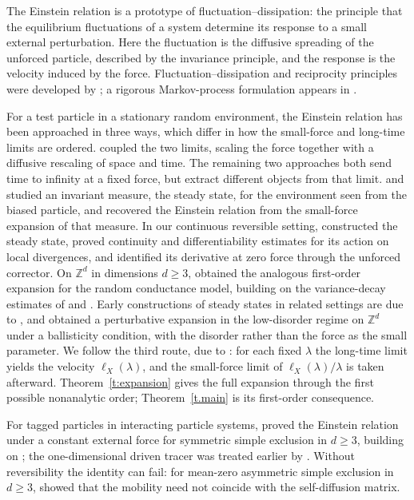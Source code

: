 \documentclass[11pt]{amsart}
\theoremstyle{definition}
\theoremstyle{remark}
\numberwithin{equation}{section}
\newcommand{\Zd}{\mathbb Z^d}
\begin{document}
The Einstein relation is a prototype of fluctuation--dissipation: the principle that the equilibrium fluctuations of a system determine its response to a small external perturbation. Here the fluctuation is the diffusive spreading of the unforced particle, described by the invariance principle, and the response is the velocity induced by the force. Fluctuation--dissipation and reciprocity principles were developed by \citet{Nyquist1928,Onsager1931,Onsager1931II,CallenWelton1951}; a rigorous Markov-process formulation appears in \citet{DemboDeuschel2010}.

For a test particle in a stationary random environment, the Einstein relation has been approached in three ways, which differ in how the small-force and long-time limits are ordered. \citet{LebowitzRost1994} coupled the two limits, scaling the force together with a diffusive rescaling of space and time. The remaining two approaches both send time to infinity at a fixed force, but extract different objects from that limit. \citet{Steady2018mathieu} and \citet*{GantertGuoNagel2017} studied an invariant measure, the steady state, for the environment seen from the biased particle, and recovered the Einstein relation from the small-force expansion of that measure. In our continuous reversible setting, \citet{Steady2018mathieu} constructed the steady state, proved continuity and differentiability estimates for its action on local divergences, and identified its derivative at zero force through the unforced corrector. On $\Zd$ in dimensions $d\geq3$, \citet*{GantertGuoNagel2017} obtained the analogous first-order expansion for the random conductance model, building on the variance-decay estimates of \citet{vardecay} and \citet{deBuyerMourrat2015}. Early constructions of steady states in related settings are due to \citet{KomorowskiKrupa2004}, and \citet*{CamposRamirez2017} obtained a perturbative expansion in the low-disorder regime on $\Zd$ under a ballisticity condition, with the disorder rather than the force as the small parameter. We follow the third route, due to \citet*{Einstein2012gantert}: for each fixed $\lambda$ the long-time limit yields the velocity $\ell_X(\lambda)$, and the small-force limit of $\ell_X(\lambda)/\lambda$ is taken afterward. Theorem~\ref{t:expansion} gives the full expansion through the first possible nonanalytic order; Theorem~\ref{t.main} is its first-order consequence.

For tagged particles in interacting particle systems, \citet{Loulakis2002} proved the Einstein relation under a constant external force for symmetric simple exclusion in $d\geq3$, building on \citet{KipnisVaradhan1986}; the one-dimensional driven tracer was treated earlier by \citet*{LandimOllaVolchan1998}. Without reversibility the identity can fail: for mean-zero asymmetric simple exclusion in $d\geq3$, \citet{Loulakis2005} showed that the mobility need not coincide with the self-diffusion matrix.
\end{document}
